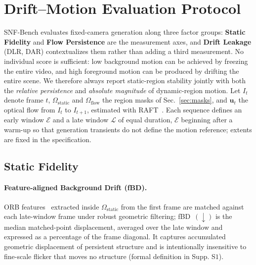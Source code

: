 \section{Drift--Motion Evaluation Protocol}
\label{sec:metrics}

SNF-Bench evaluates fixed-camera generation along three factor groups: \textbf{Static Fidelity} and \textbf{Flow Persistence} are the measurement axes, and \textbf{Drift Leakage} (DLR, DAR) contextualizes them rather than adding a third measurement. No individual score is sufficient: low background motion can be achieved by freezing the entire video, and high foreground motion can be produced by drifting the entire scene. We therefore always report static-region stability jointly with both the \emph{relative persistence} and \emph{absolute magnitude} of dynamic-region motion. Let $I_t$ denote frame $t$, $\Omega_{\mathrm{static}}$ and $\Omega_{\mathrm{flow}}$ the region masks of Sec.~\ref{sec:masks}, and $\mathbf{u}_t$ the optical flow from $I_t$ to $I_{t+1}$, estimated with RAFT~\cite{teed2020raft}. Each sequence defines an early window $\mathcal{E}$ and a late window $\mathcal{L}$ of equal duration, $\mathcal{E}$ beginning after a warm-up so that generation transients do not define the motion reference; extents are fixed in the specification.

\subsection{Static Fidelity}
\label{sec:static_metrics}

\paragraph{Feature-aligned Background Drift (fBD).}
ORB features~\cite{rublee2011orb} extracted inside $\Omega_{\mathrm{static}}$ from the first frame are matched against each late-window frame under robust geometric filtering; fBD~$(\downarrow)$ is the median matched-point displacement, averaged over the late window and expressed as a percentage of the frame diagonal. It captures accumulated geometric displacement of persistent structure and is intentionally insensitive to fine-scale flicker that moves no structure (formal definition in Supp. S$1$).

